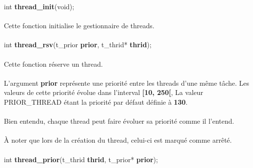 \documentclass[10pt,a4wide]{article}
\begin{document}
\hspace{1.5cm}int \textbf{thread\_init}(void);

\paragraph{}

Cette fonction initialise le gestionnaire de threads.

\paragraph{}

\hspace{1.5cm}int \textbf{thread\_rsv}(t\_prior \textbf{prior},
                                       t\_thrid* \textbf{thrid});

\paragraph{}

Cette fonction r\'eserve un thread.

\paragraph{}

L'argument \textbf{prior} repr\'esente une priorit\'e entre les threads
d'une m\^eme t\^ache. Les valeurs de cette priorit\'e \'evolue dans
l'interval \textbf{[10, 250[}, La valeur PRIOR\_THREAD \'etant la priorit\'e
par d\'efaut d\'efinie \`a \textbf{130}.

\paragraph{}

Bien entendu, chaque thread peut faire \'evoluer sa priorit\'e comme il
l'entend.

\paragraph{}

\`A noter que lors de la cr\'eation du thread, celui-ci est marqu\'e
comme arr\^et\'e.

\paragraph{}

\hspace{1.5cm}int \textbf{thread\_prior}(t\_thrid \textbf{thrid},
                                         t\_prior* \textbf{prior});
\end{document}
